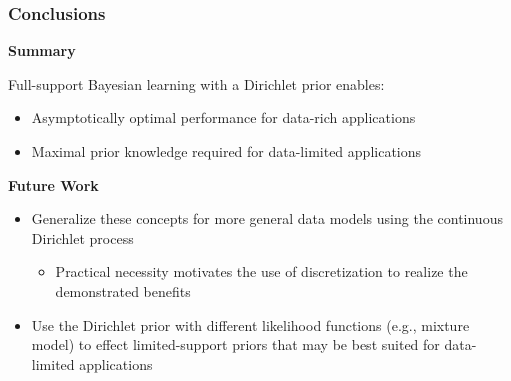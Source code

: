 \documentclass[aspectratio=169]{beamer}
\begin{document}
\begin{frame}
\frametitle{Conclusions}

\textbf{Summary}

Full-support Bayesian learning with a Dirichlet prior enables:
\begin{itemize}
\item Asymptotically \alert{optimal} performance for data-rich applications 
\item \alert{Maximal} prior knowledge required for data-limited applications
\end{itemize}

\vspace{1em}
\textbf{Future Work}
\begin{itemize}
\item Generalize these concepts for more general data models using the continuous Dirichlet process 
\begin{itemize}
\item Practical necessity motivates the use of \alert{discretization} to realize the demonstrated benefits
\end{itemize}
\item Use the Dirichlet prior with different likelihood functions (e.g., mixture model) to effect limited-support priors that may be best suited for data-limited applications
\end{itemize}


\end{frame}
\end{document}
